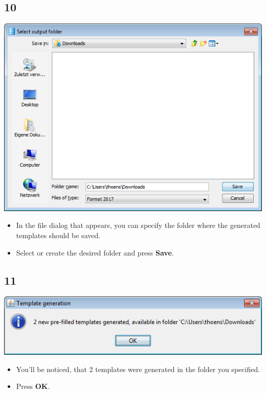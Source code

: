 \documentclass{beamer}
\begin{document}
\subsection{10}
\begin{frame}
	\begin{center}
  		\includegraphics[height=0.5\textheight]{10.png}
	\end{center}
	\begin{itemize}
		\item In the file dialog that appears, you can specify the folder where the generated templates should be saved.
		\item Select or create the desired folder and press \textbf{Save}.
	\end{itemize}
\end{frame}

\subsection{11}
\begin{frame}
	\begin{center}
  		\includegraphics[height=0.2\textheight]{11.png}
	\end{center}
	\begin{itemize}
		\item You'll be noticed, that 2 templates were generated in the folder you specified.
		\item Press \textbf{OK}.
	\end{itemize}
\end{frame}
\end{document}
